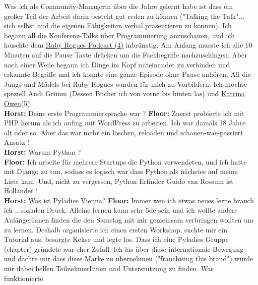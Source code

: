 Was ich als Community-Managerin über die Jahre gelernt habe ist dass ein großer Teil der Arbeit darin besteht gut reden zu können ("Talking the Talk"... sich selbst und die eigenen Fähigkeiten verbal präsentieren zu können). Ich begann all die Konferenz-Talks über Programmierung anzuschauen, und ich lauschte dem \href{http://rubyrogues.com/}{Ruby Rogues Podcast (4)} inbrünstig. Am Anfang musste ich alle 10 Minuten auf die Pause Taste drücken um die Fachbegriffe nachzuschlagen. Aber nach einer Weile begann ich Dinge im Kopf miteinander zu verbinden und erkannte Begriffe und ich konnte eine ganze Episode ohne Pause anhören. All die Jungs und Mädels bei Ruby Rogues wurden für mich zu Vorbildern. Ich mochte speziell Andi Grimm (Dessen Bücher ich von vorne bis hinten las) und \href{http://kytrinyx.com/}{Katrina Owen}(5). \\

\textbf{Horst:} Deine erste Programmiersprache war ?
\textbf{Floor:} Zuerst probierte ich mit PHP herum als ich anfing mit WordPress zu arbeiten. Ich war damals 18 Jahre alt oder so. Aber das war mehr ein löschen, reloaden und schauen-was-passiert Ansatz ! \\

\textbf{Horst:} Warum Python ? \\
\textbf{Floor:} Ich arbeite für mehrere Startups die Python verwendeten, und ich hatte mit Django zu tun, sodass es logisch war dass Python als nächstes auf meine Liste kam. Und, nicht zu vergessen, Python Erfinder Guido van Rossum ist Holländer ! \\
\textbf{Horst:} Was ist Pyladies Vienna?
\textbf{Floor:} Immer wen ich etwas neues lerne brauch ich ...sozialen Druck. Alleine lernen kann sehr öde sein und ich wollte andere AnfängerInnen finden die den Samstag mit mir gemeinsam verbringen wollten um zu lernen. Deshalb organisierte ich einen ersten Workshop, suchte mir ein Tutorial aus, besorgte Kekse und legte los. Dass ich eine Pyladies Gruppe (chapter) gründete war eher Zufall. Ich las über diese internationale Bewegung und dachte mir dass diese Marke zu übernehmen ("franchising this brand") würde mir dabei helfen TeilnehmerInnen und Unterstützung zu finden. Was funktionierte.

